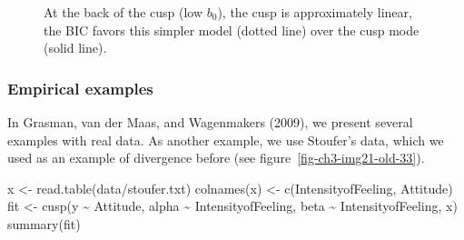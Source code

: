 \documentclass[
  a4paper,
  DIV=11,
  numbers=noendperiod,
  oneside]{scrreprt}
\newenvironment{Shaded}{}{}
\newcommand{\FunctionTok}[1]{\textcolor[rgb]{0.44,0.26,0.76}{#1}}
\newcommand{\NormalTok}[1]{\textcolor[rgb]{0.14,0.16,0.18}{#1}}
\newcommand{\OtherTok}[1]{\textcolor[rgb]{0.44,0.26,0.76}{#1}}
\newcommand{\SpecialCharTok}[1]{\textcolor[rgb]{0.00,0.36,0.77}{#1}}
\newcommand{\StringTok}[1]{\textcolor[rgb]{0.01,0.18,0.38}{#1}}
\begin{document}
\begin{figure}


\caption{\label{fig-ch3-img23-old-35}At the back of the cusp (low
\(b_0\)), the cusp is approximately linear, the BIC favors this simpler
model (dotted line) over the cusp mode (solid line).}

\end{figure}%

\subsubsection{Empirical examples}\label{sec-Empirical-examples}

In Grasman, van der Maas, and Wagenmakers (2009), we present several
examples with real data. As another example, we use Stoufer's data,
which we used as an example of divergence before (see
figure~\ref{fig-ch3-img21-old-33}).

\begin{Shaded}
\begin{Highlighting}[]
\NormalTok{x }\OtherTok{\textless{}{-}} \FunctionTok{read.table}\NormalTok{(}\StringTok{\textquotesingle{}data/stoufer.txt\textquotesingle{}}\NormalTok{)}
\FunctionTok{colnames}\NormalTok{(x) }\OtherTok{\textless{}{-}} \FunctionTok{c}\NormalTok{(}\StringTok{\textquotesingle{}IntensityofFeeling\textquotesingle{}}\NormalTok{, }\StringTok{\textquotesingle{}Attitude\textquotesingle{}}\NormalTok{)}
\NormalTok{fit }\OtherTok{\textless{}{-}} \FunctionTok{cusp}\NormalTok{(y }\SpecialCharTok{\textasciitilde{}}\NormalTok{ Attitude, alpha }\SpecialCharTok{\textasciitilde{}}\NormalTok{ IntensityofFeeling, }
\NormalTok{            beta }\SpecialCharTok{\textasciitilde{}}\NormalTok{ IntensityofFeeling, x)}
\FunctionTok{summary}\NormalTok{(fit)}
\end{Highlighting}
\end{Shaded}
\end{document}
